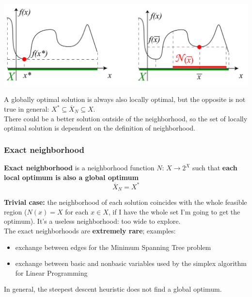 \documentclass[11pt]{article}
\begin{document}
	\begin{center}
		\includegraphics[width=\columnwidth]{img/localOptimum}
	\end{center}
	
	A globally optimal solution is always also locally optimal, but the opposite is not true in general: $X^\ast \subseteq \overline{X}_N \subseteq X$.\\
	
	There could be a better solution outside of the neighborhood, so the set of locally optimal solution is dependent on the definition of neighborhood.\\
	
	\newpage
	
	\subsubsection{Exact neighborhood}
	
	\textbf{Exact neighborhood} is a neighborhood function $N : \, X \rightarrow 2^X$ such that \textbf{each local optimum is also a global optimum}
	$$ \overline{X}_N = X^\ast $$

	\textbf{Trivial case:} the neighborhood of each solution coincides with the whole feasible region ($N (x) = X$ for each $x \in X$, if I have the whole set I'm going to get the optimum). It's a useless neighborhood: too wide to explore.\\
	
	The exact neighborhoods are \textbf{extremely rare}; examples: 
	\begin{itemize}
		\item exchange between edges for the Minimum Spanning Tree problem
		
		\item exchange between basic and nonbasic variables used by the simplex algorithm for Linear Programming
	\end{itemize}
	
	In general, the steepest descent heuristic does not find a global optimum.\\
	
\end{document}
